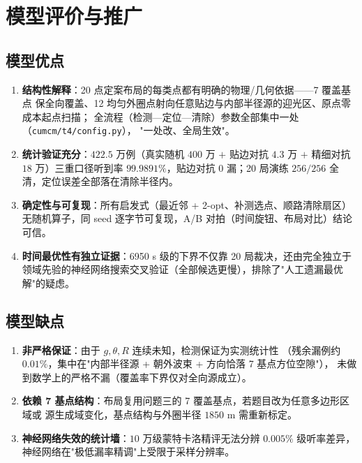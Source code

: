 \section{模型评价与推广}

\subsection{模型优点}

\begin{enumerate}
  \item \textbf{结构性解释}：20 点定案布局的每类点都有明确的物理/几何依据——7 覆盖基点
        保全向覆盖、12 均匀外圈点射向任意贴边与内部半径源的迎光区、原点零成本起点扫描；
        全流程（检测—定位—清除）参数全部集中一处（\texttt{cumcm/t4/config.py}），
        "一处改、全局生效"。
  \item \textbf{统计验证充分}：$422.5$ 万例（真实随机 $400$ 万 $+$ 贴边对抗 $4.3$ 万
        $+$ 精细对抗 $18$ 万）三重口径听到率 $99.9891\%$，贴边对抗 0 漏；20 局演练
        $256/256$ 全清，定位误差全部落在清除半径内。
  \item \textbf{确定性与可复现}：所有启发式（最近邻 + 2-opt、补测选点、顺路清除扇区）
        无随机算子，同 seed 逐字节可复现，A/B 对拍（时间旋钮、布局对比）结论可信。
  \item \textbf{时间最优性有独立证据}：6950 s 级的下界不仅靠 20 局裁决，还由完全独立于
        领域先验的神经网络搜索交叉验证（全部候选更慢），排除了"人工遗漏最优解"的疑虑。
\end{enumerate}

\subsection{模型缺点}

\begin{enumerate}
  \item \textbf{非严格保证}：由于 $g,\theta,R$ 连续未知，检测保证为实测统计性
        （残余漏例约 $0.01\%$，集中在"内部半径源 + 朝外波束 + 方向恰落 7 基点方位空隙"），
        未做到数学上的严格不漏（覆盖率下界仅对全向源成立）。
  \item \textbf{依赖 7 基点结构}：布局复用问题三的 7 覆盖基点，若题目改为任意多边形区域或
        源生成域变化，基点结构与外圈半径 $1850$ m 需重新标定。
  \item \textbf{神经网络失效的统计墙}：$10$ 万级蒙特卡洛精评无法分辨 $0.005\%$ 级听率差异，
        神经网络在"极低漏率精调"上受限于采样分辨率。
\end{enumerate}


